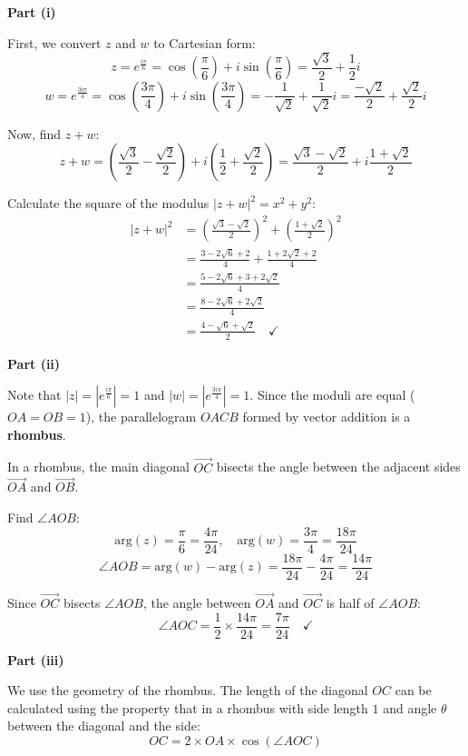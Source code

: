 \begin{solution}
\textbf{Part (i)}

First, we convert $z$ and $w$ to Cartesian form:
\[
z = e^{\frac{i\pi}{6}} = \cos\left(\frac{\pi}{6}\right) + i\sin\left(\frac{\pi}{6}\right) = \frac{\sqrt{3}}{2} + \frac{1}{2}i
\]
\[
w = e^{\frac{3i\pi}{4}} = \cos\left(\frac{3\pi}{4}\right) + i\sin\left(\frac{3\pi}{4}\right) = -\frac{1}{\sqrt{2}} + \frac{1}{\sqrt{2}}i = \frac{-\sqrt{2}}{2} + \frac{\sqrt{2}}{2}i
\]

Now, find $z + w$:
\[
z + w = \left(\frac{\sqrt{3}}{2} - \frac{\sqrt{2}}{2}\right) + i\left(\frac{1}{2} + \frac{\sqrt{2}}{2}\right) = \frac{\sqrt{3}-\sqrt{2}}{2} + i\frac{1+\sqrt{2}}{2}
\]

Calculate the square of the modulus $|z+w|^2 = x^2 + y^2$:
\begin{align*}
|z+w|^2 &= \left(\frac{\sqrt{3}-\sqrt{2}}{2}\right)^2 + \left(\frac{1+\sqrt{2}}{2}\right)^2 \\
&= \frac{3 - 2\sqrt{6} + 2}{4} + \frac{1 + 2\sqrt{2} + 2}{4} \\
&= \frac{5 - 2\sqrt{6} + 3 + 2\sqrt{2}}{4} \\
&= \frac{8 - 2\sqrt{6} + 2\sqrt{2}}{4} \\
&= \frac{4 - \sqrt{6} + \sqrt{2}}{2} \quad \checkmark
\end{align*}

\textbf{Part (ii)}

Note that $|z| = |e^{\frac{i\pi}{6}}| = 1$ and $|w| = |e^{\frac{3i\pi}{4}}| = 1$. Since the moduli are equal ($OA = OB = 1$), the parallelogram $OACB$ formed by vector addition is a \textbf{rhombus}.

In a rhombus, the main diagonal $\overrightarrow{OC}$ bisects the angle between the adjacent sides $\overrightarrow{OA}$ and $\overrightarrow{OB}$.

Find $\angle AOB$:
\[
\text{arg}(z) = \frac{\pi}{6} = \frac{4\pi}{24}, \quad \text{arg}(w) = \frac{3\pi}{4} = \frac{18\pi}{24}
\]
\[
\angle AOB = \text{arg}(w) - \text{arg}(z) = \frac{18\pi}{24} - \frac{4\pi}{24} = \frac{14\pi}{24}
\]

Since $\overrightarrow{OC}$ bisects $\angle AOB$, the angle between $\overrightarrow{OA}$ and $\overrightarrow{OC}$ is half of $\angle AOB$:
\[
\angle AOC = \frac{1}{2} \times \frac{14\pi}{24} = \frac{7\pi}{24} \quad \checkmark
\]

\textbf{Part (iii)}

We use the geometry of the rhombus. The length of the diagonal $OC$ can be calculated using the property that in a rhombus with side length $1$ and angle $\theta$ between the diagonal and the side:
\[
OC = 2 \times OA \times \cos(\angle AOC)
\]


\end{solution}
